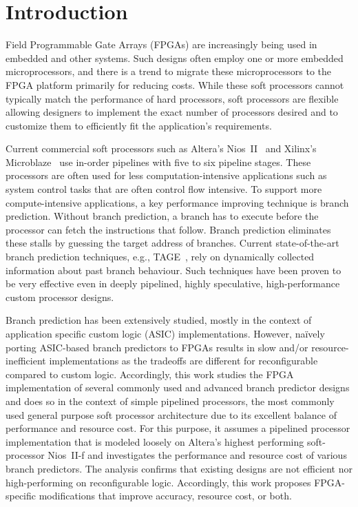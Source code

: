 \chapter{Introduction}
\label{chap:introduction}

Field Programmable Gate Arrays (FPGAs) are increasingly being used in embedded and other systems. Such designs often employ one or more embedded microprocessors, and there is a trend to migrate these microprocessors to the FPGA platform primarily for reducing costs. While these soft processors cannot typically match the performance of hard processors, soft processors are flexible allowing designers to implement the exact number of processors desired and to customize them to efficiently fit the application's requirements.

Current commercial soft processors such as Altera's Nios~II~\cite{niosii} and Xilinx's Microblaze~\cite{microblaze} use in-order pipelines with five to six pipeline stages. These processors are often used for less computation-intensive applications such as system control tasks that are often control flow intensive. To support more compute-intensive applications, a key performance improving technique is branch prediction. Without branch prediction, a branch has to execute before the processor can fetch the instructions that follow. Branch prediction eliminates these stalls by guessing the target address of branches. Current state-of-the-art branch prediction techniques, e.g., TAGE~\cite{tage}, rely on dynamically collected information about past branch behaviour. Such techniques have been proven to be very effective even in deeply pipelined, highly speculative, high-performance custom processor designs.

Branch prediction has been extensively studied, mostly in the context of application specific custom logic (ASIC) implementations. However, na\"ively porting ASIC-based branch predictors to FPGAs results in slow and/or resource-inefficient implementations as the tradeoffs are different for reconfigurable compared to custom logic. Accordingly, this work studies the FPGA implementation of several commonly used and advanced branch predictor designs and does so in the context of simple pipelined processors, the most commonly used general purpose soft processor architecture due to its excellent balance of performance and resource cost. For this purpose, it assumes a pipelined processor implementation that is modeled loosely on Altera's highest performing soft-processor Nios~II-f and investigates the performance and resource cost of various branch predictors. The analysis confirms that existing designs are not efficient nor high-performing on reconfigurable logic. Accordingly, this work proposes FPGA-specific modifications that improve accuracy, resource cost, or both.


